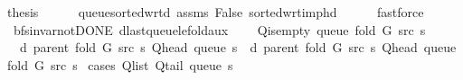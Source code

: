 \begin{isabellebody}
\ {\isacharquery}{\kern0pt}thesis\isanewline
\ \ \ \ \isamarkupfalse%
\ queue{\isacharunderscore}{\kern0pt}sorted{\isacharunderscore}{\kern0pt}wrt{\isacharunderscore}{\kern0pt}d\ assms\ False\ sorted{\isacharunderscore}{\kern0pt}wrt{\isacharunderscore}{\kern0pt}imp{\isacharunderscore}{\kern0pt}hd\isanewline
\ \ \ \ \isamarkupfalse%
\ fastforce\isanewline
{}\isamarkupfalse%
%
\endisatagproof
{\isafoldproof}%
%
\isadelimproof
\isanewline
%
\endisadelimproof
%
\isadeliminvisible
\isanewline
%
\endisadeliminvisible
%
\isataginvisible
{}\isamarkupfalse%
\ {\isacharparenleft}{\kern0pt}\ bfs{\isacharunderscore}{\kern0pt}invar{\isacharunderscore}{\kern0pt}not{\isacharunderscore}{\kern0pt}DONE{\isacharparenright}{\kern0pt}\ d{\isacharunderscore}{\kern0pt}last{\isacharunderscore}{\kern0pt}queue{\isacharunderscore}{\kern0pt}le{\isacharunderscore}{\kern0pt}fold{\isacharunderscore}{\kern0pt}aux{\isacharunderscore}{\kern0pt}{}{\isacharcolon}{\kern0pt}\isanewline
\ \ \ {\isachardoublequoteopen}{\isasymnot}\ Q{\isacharunderscore}{\kern0pt}is{\isacharunderscore}{\kern0pt}empty\ {\isacharparenleft}{\kern0pt}queue\ {\isacharparenleft}{\kern0pt}fold\ G\ src\ s{\isacharparenright}{\kern0pt}{\isacharparenright}{\kern0pt}{\isachardoublequoteclose}\isanewline
\ \ \ {\isachardoublequoteopen}d\ {\isacharparenleft}{\kern0pt}parent\ {\isacharparenleft}{\kern0pt}fold\ G\ src\ s{\isacharparenright}{\kern0pt}{\isacharparenright}{\kern0pt}\ {\isacharparenleft}{\kern0pt}Q{\isacharunderscore}{\kern0pt}head\ {\isacharparenleft}{\kern0pt}queue\ s{\isacharparenright}{\kern0pt}{\isacharparenright}{\kern0pt}\ {\isasymle}\ d\ {\isacharparenleft}{\kern0pt}parent\ {\isacharparenleft}{\kern0pt}fold\ G\ src\ s{\isacharparenright}{\kern0pt}{\isacharparenright}{\kern0pt}\ {\isacharparenleft}{\kern0pt}Q{\isacharunderscore}{\kern0pt}head\ {\isacharparenleft}{\kern0pt}queue\ {\isacharparenleft}{\kern0pt}fold\ G\ src\ s{\isacharparenright}{\kern0pt}{\isacharparenright}{\kern0pt}{\isacharparenright}{\kern0pt}{\isachardoublequoteclose}%
\endisataginvisible
{\isafoldinvisible}%
%
\isadeliminvisible
\isanewline
%
\endisadeliminvisible
%
\isadelimproof
%
\endisadelimproof
%
\isatagproof
{}\isamarkupfalse%
\ {\isacharparenleft}{\kern0pt}cases\ {\isachardoublequoteopen}Q{\isacharunderscore}{\kern0pt}list\ {\isacharparenleft}{\kern0pt}Q{\isacharunderscore}{\kern0pt}tail\ {\isacharparenleft}{\kern0pt}queue\ s{\isacharparenright}{\kern0pt}{\isacharparenright}{\kern0pt}\ {\isacharequal}{\kern0pt}\ {\isacharbrackleft}{\kern0pt}{\isacharbrackright}{\kern0pt}{\isachardoublequoteclose}{\isacharparenright}{\kern0pt}\isanewline

\end{isabellebody}
